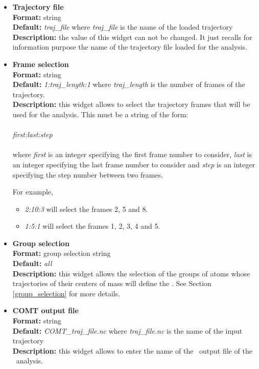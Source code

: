 \documentclass[a4paper,11pt]{report}
\begin{document}
\hypertarget{comt_trajectory_file}{}
\begin{itemize}
\item \textbf{Trajectory file}\\
\textbf{Format:} string\\
\textbf{Default:} \textit{traj\_file} where \textit{traj\_file} is the name of the loaded trajectory\\
\textbf{Description:} the value of this widget can not be changed. It just recalls for information purpose the name
of the trajectory file loaded for the analysis.

\hypertarget{comt_frame_selection}{}
\item \textbf{Frame selection}\\
\textbf{Format:} string\\
\textbf{Default:} \textit{1:traj\_length:1} where \textit{traj\_length} is the number of frames of the trajectory.\\
\textbf{Description:} this widget allows to select the trajectory frames that will be used for the analysis. This must
be a string of the form:
\\\\
\textit{first:last:step}
\\\\
where \textit{first} is an integer specifying the first frame number to consider, \textit{last} is an integer specifying the last 
frame number to consider and \textit{step} is an integer specifying the step number between two frames.

For example,
\begin{itemize}
\item \textit{2:10:3} will select the frames 2, 5 and 8.
\item \textit{1:5:1} will select the frames 1, 2, 3, 4 and 5.
\end{itemize}

\hypertarget{comt_group_selection}{}
\item \textbf{Group selection}\\
\textbf{Format:} group selection string\\
\textbf{Default:} \textit{all}\\
\textbf{Description:} this widget allows the selection of the groups of atoms whose trajectories of their centers of mass 
will define the \COMT . See Section \ref{group_selection} for more details.

\hypertarget{comt_comt_output_file}{}
\item \textbf{COMT output file}\\
\textbf{Format:} string\\
\textbf{Default:} \textit{COMT\_traj\_file.nc} where \textit{traj\_file.nc} is the name of the input trajectory\\
\textbf{Description:} this widget allows to enter the name of the \NetCDF\ output file of the \COMT\ analysis.
\end{itemize}
\end{document}
